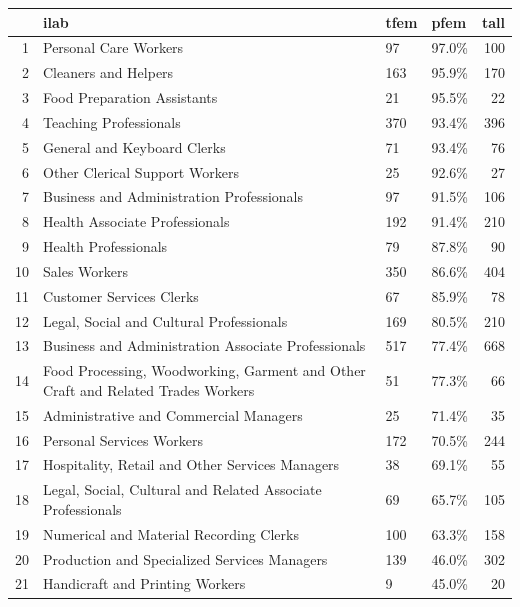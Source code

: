 \documentclass[12pt,a4paper]{article}
\numberwithin{equation}{section}
\begin{document}
{%
\begin{table}[ht]
\begin{small}
\centering
\begin{tabular}{rp{8cm}llr}
  \hline
 & ilab & tfem & pfem & tall \\ 
  \hline
1 & Personal Care Workers & 97 & 97.0\% & 100 \\ 
  2 & Cleaners and Helpers & 163 & 95.9\% & 170 \\ 
  3 & Food Preparation Assistants & 21 & 95.5\% &  22 \\ 
  4 & Teaching Professionals & 370 & 93.4\% & 396 \\ 
  5 & General and Keyboard Clerks & 71 & 93.4\% &  76 \\ 
  6 & Other Clerical Support Workers & 25 & 92.6\% &  27 \\ 
  7 & Business and Administration Professionals & 97 & 91.5\% & 106 \\ 
  8 & Health Associate Professionals & 192 & 91.4\% & 210 \\ 
  9 & Health Professionals & 79 & 87.8\% &  90 \\ 
  10 & Sales Workers & 350 & 86.6\% & 404 \\ 
  11 & Customer Services Clerks & 67 & 85.9\% &  78 \\ 
  12 & Legal, Social and Cultural Professionals & 169 & 80.5\% & 210 \\ 
  13 & Business and Administration Associate Professionals & 517 & 77.4\% & 668 \\ 
  14 & Food Processing, Woodworking, Garment and Other Craft and Related Trades Workers & 51 & 77.3\% &  66 \\ 
  15 & Administrative and Commercial Managers & 25 & 71.4\% &  35 \\ 
  16 & Personal Services Workers & 172 & 70.5\% & 244 \\ 
  17 & Hospitality, Retail and Other Services Managers & 38 & 69.1\% &  55 \\ 
  18 & Legal, Social, Cultural and Related Associate Professionals & 69 & 65.7\% & 105 \\ \hline
  19 & Numerical and Material Recording Clerks & 100 & 63.3\% & 158 \\ 
  20 & Production and Specialized Services Managers & 139 & 46.0\% & 302 \\ 
  21 & Handicraft and Printing Workers & 9 & 45.0\% &  20 \\ \hline

\end{tabular}
\end{small}
\end{table}}
\end{document}
